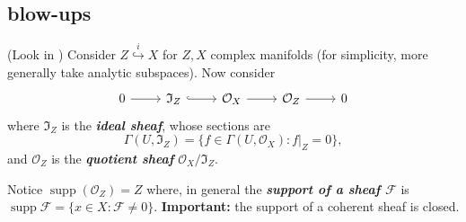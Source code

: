 \documentclass{article}
\newcommand{\Fc}{\mathcal{F}}
\newcommand{\Oc}{\mathcal{O}}
\newcommand{\If}{\mathfrak{I}}
\DeclareMathOperator{\supp}{supp}
\begin{document}
\subsection{blow-ups}
(Look in \cite{hartshorne}) Consider $Z\overset{i}{\hookrightarrow}X$ for $Z,X$ complex manifolds (for simplicity, more generally take analytic subspaces). Now consider
\[\begin{tikzcd}
	0\arrow[r]&\If_Z\arrow[r,hook]&\Oc_X\arrow[r]&\Oc_Z\arrow[r]&0
\end{tikzcd}\]
where $\If_Z$ is the \textbf{\textit{ideal sheaf}}, whose sections are
\[\Gamma(U,\If_Z)=\{f\in\Gamma(U,\Oc_X):f|_Z=0\},\]
and $\Oc_Z$ is the \textbf{\textit{quotient sheaf}} $\Oc_X/\If_Z$.

Notice $\supp(\Oc_Z)=Z$ where, in general the \textbf{\textit{support of a sheaf $\Fc$}} is $\supp\Fc=\{x\in X:\Fc\neq0\}$. \textbf{Important:} the support of a coherent sheaf is closed.
\end{document}
